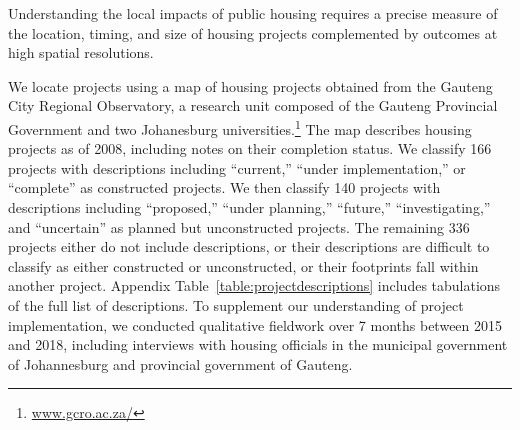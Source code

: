 \documentclass[12pt]{article}
\begin{document}
Understanding the local impacts of public housing requires a precise measure of the location, timing, and size of housing projects complemented by outcomes at high spatial resolutions.

We locate projects using a map of housing projects obtained from the Gauteng City Regional Observatory, a research unit composed of the Gauteng Provincial Government and two Johanesburg universities.\footnote{\href{url}{www.gcro.ac.za/}}  The map describes housing projects as of 2008, including notes on their completion status.  We classify 166 projects with descriptions including ``current,'' ``under implementation,'' or ``complete'' as constructed projects.  We then classify 140 projects with descriptions including ``proposed,'' ``under planning,'' ``future,'' ``investigating,'' and ``uncertain'' as planned but unconstructed projects.  The remaining 336 projects either do not include descriptions, or their descriptions are difficult to classify as either constructed or unconstructed, or their footprints fall within another project.  Appendix Table~\ref{table:projectdescriptions} includes tabulations of the full list of descriptions.  To supplement our understanding of project implementation, we conducted qualitative fieldwork over 7 months between 2015 and 2018, including interviews with housing officials in the municipal government of Johannesburg and provincial government of Gauteng. 


\end{document}
